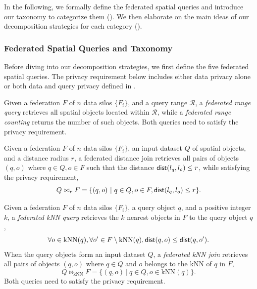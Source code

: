 In the following, we formally define the federated spatial queries and introduce our taxonomy to categorize them ().
We then elaborate on the main ideas of our decomposition strategies for each category ().

\subsubsection{Federated Spatial Queries and Taxonomy}\label{sec:rewriter-framework-taxonomy}

Before diving into our decomposition strategies, we first define the five federated spatial queries.
The privacy requirement below includes either data privacy alone or both data and query privacy defined in .

\begin{definition}\label{def:range}
Given a federation $F$ of $n$ data silos $\{F_i\}$, and a query range $\mathcal{R}$, a \textit{federated range query} retrieves all spatial objects located within $\mathcal{R}$, while a \textit{federated range counting} returns the number of such objects. 
Both queries need to satisfy the privacy requirement.
\end{definition}

\begin{definition}\label{def:disjoin}
Given a federation $F$ of $n$ data silos $\{F_i\}$, an input dataset $Q$ of spatial objects, and a distance radius $r$, a federated distance join retrieves all pairs of objects $(q,o)$ where $q \in Q, o \in F$ such that the distance $\textsf{dist}(l_q, l_o) \le r$, while satisfying the privacy requirement, \ie
\begin{equation*}
Q \bowtie_{r} F = \{(q,o)\ |\ q \in Q, o \in F, \textsf{dist}(l_q, l_o) \le r\}.
\end{equation*}
\end{definition}

\begin{definition}\label{def:knn}
Given a federation $F$ of $n$ data silos $\{F_i\}$, a query object $q$, and a positive integer $k$, a \textit{federated kNN query} retrieves the $k$ nearest objects in $F$ to the query object $q$, \ie
\begin{equation*}
    \forall o \in \text{kNN}(q), \forall o' \in F \setminus \text{kNN}(q), \textsf{dist}(q, o) \le \textsf{dist}(q, o').
\end{equation*}
When the query objects form an input dataset $Q$, a \textit{federated kNN join} retrieves all pairs of objects $(q,o)$ where $q \in Q$ and $o$ belongs to the kNN of $q$ in $F$, \ie
\begin{equation*}
    Q \bowtie_\text{kNN} F = \{(q,o)\ |\ q \in Q, o \in \text{kNN}(q)\}.
\end{equation*}
Both queries need to satisfy the privacy requirement.
\end{definition}

